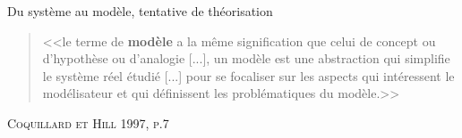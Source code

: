 \documentclass[newPxFont]{beamer}
\begin{document}
\begin{frame}[c]{Du système au modèle, tentative de théorisation}
 \vspace{-1em}
  \begin{quote}
    <<le terme de \textbf{modèle} a la même signification que celui de concept ou d'hypothèse ou d'analogie [...], un modèle est une abstraction qui simplifie le système réel étudié [...] pour se focaliser sur les aspects qui intéressent le modélisateur et qui définissent les problématiques du modèle.>>
  \end{quote}
  \hspace*{\fill}\textsc{Coquillard et Hill 1997, p.7}
  \vspace{-0.5em}
  \begin{figure}
   	\centering
   		 \hspace{0.2em} %
       \hspace{0.2em} %
   		 \hspace{0.2em} %
  \end{figure}
\end{frame}
\end{document}
